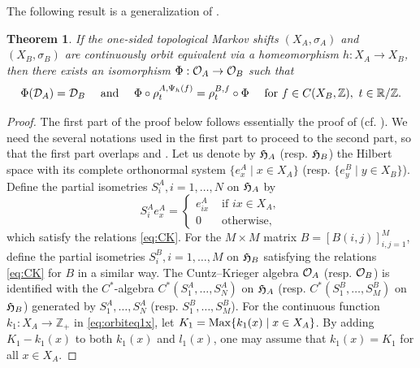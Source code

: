 \documentclass[11pt]{article}
\newtheorem{theorem}{Theorem}[section]
\theoremstyle{plain}
\theoremstyle{definition}
\numberwithin{equation}{section}
\newcommand{\RZ}{\mathbb{R}/{\mathbb{Z}}}
\newcommand{\Z}{\mathbb{Z}}
\newcommand{\Zp}{{\mathbb{Z}}_+}
\begin{document}
The following result is a generalization of 
\cite[2.17 Proposition]{CK}.
\begin{theorem}\label{thm:COETFAE}
If the one-sided topological Markov shifts
$(X_A, \sigma_A)$ and $(X_B,\sigma_B)$
are continuously orbit equivalent
via a homeomorphism $h:X_A\rightarrow X_B$,
then there exists an isomorphism
$\Phi:{{\mathcal{O}}_A} \rightarrow {{\mathcal{O}}_B}$ such that 
\begin{equation*}
\Phi(\DA) = \DB
\quad 
\text{  and }
\quad
\Phi \circ \rho^{A,\Psi_{h}(f)}_t = \rho^{B,f}_t \circ \Phi
\quad
\text{ for }
f \in C(X_B,\Z), \,\, 
 t \in \RZ.
\end{equation*}
\end{theorem}


\begin{proof}
The first part of the proof below follows essentially the proof of 
\cite[Proposition 5.6.]{MaPacific}
(cf. \cite[Proposition 6.3]{MaPre2014}).
We need the several notations used in the first part to proceed to
the second part, so that the first part
overlaps   
\cite[Proposition 5.6.]{MaPacific}
and
\cite[Proposition 6.3]{MaPre2014}.
Let us denote by 
${{\frak H}_A}$ (resp. ${{\frak H}_B}$) the Hilbert space
with its complete orthonormal system
$\{ e_x^A \mid x \in X_A\}$ 
(resp. $\{ e_y^B \mid y \in X_B\}$).
Define the partial isometries 
$S_i^A, i=1,\dots,N$ on ${{\frak H}_A}$
 by 
\begin{equation}
S_i^A e_x^A =
\begin{cases}
e_{ix}^A & \text{ if } ix \in X_A,\\
0 & \text{ otherwise,}
\end{cases}
\label{eq:siAex}
\end{equation} 
which 
satisfy the relations
\eqref{eq:CK}. 
For the $M \times M$ matrix $B =[B(i,j)]_{i,j=1}^M$,
define the 
partial isometries  $S_i^B, i=1,\dots,M$ 
on ${{\frak H}_B}$
satisfying the relations
\eqref{eq:CK} for $B$
in a similar way.
The Cuntz--Krieger algebra 
${{\mathcal{O}}_A}$ (resp.  ${{\mathcal{O}}_B}$) 
is identified with
the $C^*$-algebra 
$C^*(S_1^A,\dots, S_N^A)$  on ${{\frak H}_A}$
(resp. $C^*(S_1^B,\dots, S_M^B)$  on ${{\frak H}_B}$)
generated by $S_1^A,\dots, S_N^A$
(resp. $S_1^B,\dots, S_M^B$).
For the continuous function 
$
k_1:X_A \rightarrow \Zp
$ 
in \eqref{eq:orbiteq1x},
let
$K_1 = {{\operatorname{Max}}}\{k_1(x) \mid x \in X_A\}$.
By adding 
$K_1 - k_1(x)$ to both $k_1(x)$ and $l_1(x)$,
one may assume that
$k_1(x) = K_1$ for all $x \in X_A$.




\end{proof}
\end{document}
